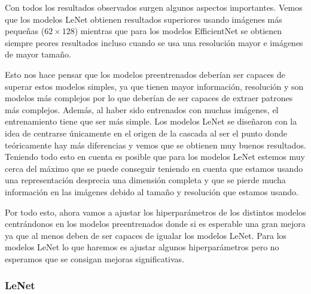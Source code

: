 \documentclass[a4paper,12pt,twoside,titlepage]{article}
\begin{document}
Con todos los resultados observados surgen algunos aspectos importantes. Vemos que los modelos LeNet obtienen resultados superiores usando imágenes más pequeñas ($62\times 128$) mientras que para los modelos EfficientNet se obtienen siempre peores resultados incluso cuando se usa una resolución mayor e imágenes de mayor tamaño.

Esto nos hace pensar que los modelos preentrenados deberían ser capaces de superar estos modelos simples, ya que tienen mayor información, resolución y son modelos más complejos por lo que deberían de ser capaces de extraer patrones más complejos. Además, al haber sido entrenados con muchas imágenes, el entrenamiento tiene que ser más simple. Los modelos LeNet se diseñaron con la idea de centrarse únicamente en el origen de la cascada al ser el punto donde teóricamente hay más diferencias y vemos que se obtienen muy buenos resultados. Teniendo todo esto en cuenta es posible que para los modelos LeNet estemos muy cerca del máximo que se puede conseguir teniendo en cuenta que estamos usando una representación desprecia una dimensión completa y que se pierde mucha información en las imágenes debido al tamaño y resolución que estamos usando.

Por todo esto, ahora vamos a ajustar los hiperparámetros de los distintos modelos centrándonos en los modelos preentrenados donde si es esperable una gran mejora ya que al menos deben de ser capaces de igualar los modelos LeNet. Para los modelos LeNet lo que haremos es ajustar algunos hiperparámetros pero no esperamos que se consigan mejoras significativas.


\subsubsection*{LeNet}
\end{document}
